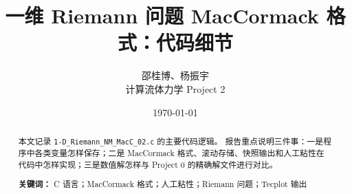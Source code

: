 \documentclass[UTF8,12pt,a4paper]{ctexart}
\title{一维 Riemann 问题 MacCormack 格式：代码细节}
\author{邵桂博、杨振宇\\计算流体力学 Project 2}
\date{\today}
\begin{document}
\maketitle

\begin{abstract}
本文记录 \texttt{1-D\_Riemann\_NM\_MacC\_02.c} 的主要代码逻辑。
报告重点说明三件事：一是程序中各类变量怎样保存；二是 MacCormack
格式、滚动存储、快照输出和人工粘性在代码中怎样实现；三是数值解怎样与 Project 0 的精确解文件进行对比。

\textbf{关键词：} C 语言；MacCormack 格式；人工粘性；Riemann 问题；Tecplot 输出
\end{abstract}

\tableofcontents
\newpage







\end{document}

